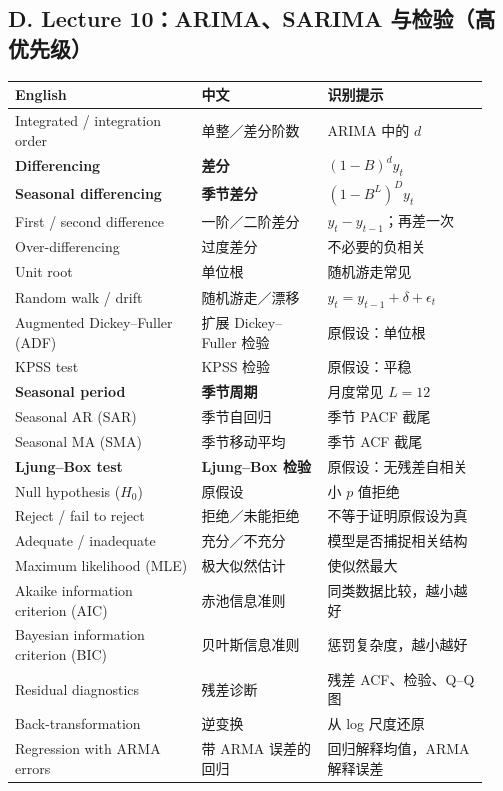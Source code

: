 \documentclass[UTF8,fontset=fandol,10.5pt,a4paper]{ctexart}
\begin{document}
\subsection*{D. Lecture 10：ARIMA、SARIMA 与检验（高优先级）}
\begin{longtable}{@{}p{0.37\linewidth}p{0.25\linewidth}p{0.32\linewidth}@{}}
\toprule English & 中文 & 识别提示\\\midrule\endhead
Integrated / integration order & 单整／差分阶数 & ARIMA 中的 $d$\\
\textbf{Differencing} & \textbf{差分} & $(1-B)^dy_t$\\
\textbf{Seasonal differencing} & \textbf{季节差分} & $(1-B^L)^Dy_t$\\
First / second difference & 一阶／二阶差分 & $y_t-y_{t-1}$；再差一次\\
Over-differencing & 过度差分 & 不必要的负相关\\
Unit root & 单位根 & 随机游走常见\\
Random walk / drift & 随机游走／漂移 & $y_t=y_{t-1}+\delta+\epsilon_t$\\
Augmented Dickey--Fuller (ADF) & 扩展 Dickey--Fuller 检验 & 原假设：单位根\\
KPSS test & KPSS 检验 & 原假设：平稳\\
\textbf{Seasonal period} & \textbf{季节周期} & 月度常见 $L=12$\\
Seasonal AR (SAR) & 季节自回归 & 季节 PACF 截尾\\
Seasonal MA (SMA) & 季节移动平均 & 季节 ACF 截尾\\
\textbf{Ljung--Box test} & \textbf{Ljung--Box 检验} & 原假设：无残差自相关\\
Null hypothesis ($H_0$) & 原假设 & 小 $p$ 值拒绝\\
Reject / fail to reject & 拒绝／未能拒绝 & 不等于证明原假设为真\\
Adequate / inadequate & 充分／不充分 & 模型是否捕捉相关结构\\
Maximum likelihood (MLE) & 极大似然估计 & 使似然最大\\
Akaike information criterion (AIC) & 赤池信息准则 & 同类数据比较，越小越好\\
Bayesian information criterion (BIC) & 贝叶斯信息准则 & 惩罚复杂度，越小越好\\
Residual diagnostics & 残差诊断 & 残差 ACF、检验、Q--Q 图\\
Back-transformation & 逆变换 & 从 log 尺度还原\\
Regression with ARMA errors & 带 ARMA 误差的回归 & 回归解释均值，ARMA 解释误差\\
\bottomrule
\end{longtable}
\end{document}
